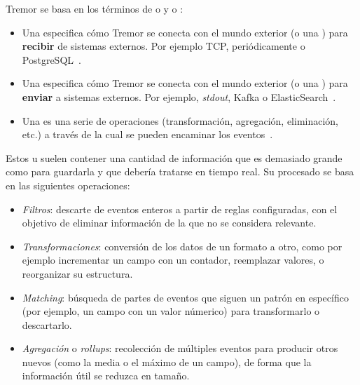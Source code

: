 Tremor se basa en los términos de \onramps o \sources y \offramps o \sinks:

\begin{itemize}
    \item Una \onramp especifica cómo Tremor se conecta con el mundo exterior (o
        una \pipeline) para \textbf{recibir} de sistemas externos. Por ejemplo
        TCP, periódicamente o PostgreSQL~\cite{tremoronramps}.

    \item Una \offramp especifica cómo Tremor se conecta con el mundo exterior
        (o una \pipeline) para \textbf{enviar} a sistemas externos. Por ejemplo,
        \emph{stdout}, Kafka o ElasticSearch~\cite{tremorofframps}.

    \item Una \pipeline es una serie de operaciones (transformación, agregación,
        eliminación, etc.) a través de la cual se pueden encaminar los
        eventos~\cite{tremorpipelines}.

\end{itemize}

Estos \onramps u \offramps suelen contener una cantidad de información que es
demasiado grande como para guardarla y que debería tratarse en tiempo real. Su
procesado se basa en las siguientes operaciones:

\begin{itemize}
    \item \emph{Filtros}: descarte de eventos enteros a partir de reglas
        configuradas, con el objetivo de eliminar información de la \pipeline
        que no se considera relevante.

    \item \emph{Transformaciones}: conversión de los datos de un formato a otro,
        como por ejemplo incrementar un campo con un contador, reemplazar
        valores, o reorganizar su estructura.

    \item \emph{Matching}: búsqueda de partes de eventos que siguen un patrón en
        específico (por ejemplo, un campo  con un valor númerico)
        para transformarlo o descartarlo.

    \item \emph{Agregación} o \emph{rollups}: recolección de múltiples eventos
        para producir otros nuevos (como la media o el máximo de un campo), de
        forma que la información útil se reduzca en tamaño.

\end{itemize}

